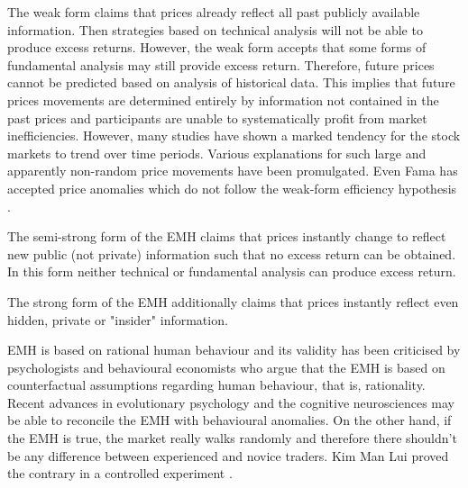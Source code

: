 The weak form claims that prices already reflect all past publicly available information. Then strategies based on technical analysis will not be able to produce excess returns. However, the weak form accepts that some forms of fundamental analysis may still provide excess return. Therefore, future prices cannot be predicted based on analysis of historical data. This implies that future prices movements are determined entirely by information not contained in the past prices and participants are unable to systematically profit from market inefficiencies. 
However, many studies have shown a marked tendency for the stock markets to trend over time periods. Various explanations for such large and apparently non-random price movements have been promulgated. Even Fama has accepted price anomalies which do not follow the weak-form efficiency hypothesis \cite{fama+french2008}.

The semi-strong form of the EMH claims that prices instantly change to reflect new public (not private) information such that no excess return can be obtained. In this form neither technical or fundamental analysis can produce excess return.

The strong form of the EMH additionally claims that prices instantly reflect even hidden, private or "insider" information. 

EMH is based on rational human behaviour and its validity has been criticised by
psychologists and behavioural economists who argue that the EMH is based
on counterfactual assumptions regarding human behaviour, that is,
rationality. Recent advances in evolutionary psychology and the cognitive
neurosciences may be able to reconcile the EMH with behavioural
anomalies. On the other hand, if the EMH is true, the market really walks randomly and therefore there shouldn't be any difference between experienced and novice traders. Kim Man Lui proved the contrary in a controlled experiment \cite{man2013}.
